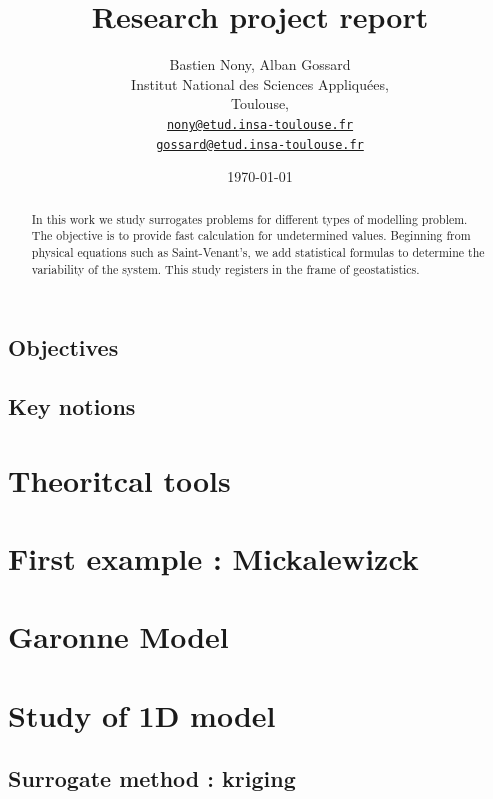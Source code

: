 \documentclass[hidelinks,12pt]{article}
\begin{document}
\title{Research project report}
\author{Bastien Nony, Alban Gossard\\
Institut National des Sciences Appliquées,\\
Toulouse,\\
\href{mailto:nony@etud.insa-toulouse.fr}{   \texttt{nony@etud.insa-toulouse.fr}}\\
\href{mailto:gossard@etud.insa-toulouse.fr}{   \texttt{gossard@etud.insa-toulouse.fr}}}
\date{\today}

\maketitle

\begin{abstract}
In this work we study surrogates problems for different types of modelling problem. The objective is to provide fast calculation for undetermined values. Beginning from physical equations such as Saint-Venant's, we add statistical formulas to determine the variability of the system. This study registers in the frame of geostatistics.
\end{abstract}

\tableofcontents



\subsection{Objectives}
\subsection{Key notions}
\section{Theoritcal tools}
\section{First example : Mickalewizck}
\section{Garonne Model }




\section{Study of 1D model}

\subsection{Surrogate method : kriging}
\end{document}

